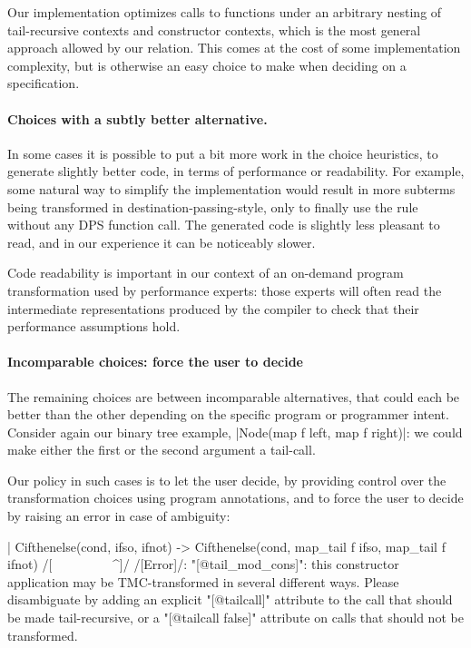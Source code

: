 Our implementation optimizes calls to functions under an arbitrary
nesting of tail-recursive contexts and constructor contexts, which is
the most general approach allowed by our relation. This comes at the
cost of some implementation complexity, but is otherwise an easy
choice to make when deciding on a specification.

\paragraph{Choices with a subtly better alternative.} In some cases it
is possible to put a bit more work in the choice heuristics, to
generate slightly better code, in terms of performance or
readability. For example, some natural way to simplify the
implementation would result in more subterms being transformed in
destination-passing-style, only to finally use the
 rule without any DPS function call. The generated
code is slightly less pleasant to read, and in our experience it can
be noticeably slower.

Code readability is important in our context of an on-demand program
transformation used by performance experts: those experts will often
read the intermediate representations produced by the compiler to
check that their performance assumptions hold.

\paragraph{Incomparable choices: force the user to decide} The
remaining choices are between incomparable alternatives, that could
each be better than the other depending on the specific program or
programmer intent. Consider again our binary tree example,
\ocaml|Node(map f left, map f right)|: we could make either the first
or the second argument a tail-call.

Our policy in such cases is to let the user decide, by providing
control over the transformation choices using \ocaml{[@tailcall]}
program annotations, and to force the user to decide by raising an
error in case of ambiguity:
\begin{Ocaml}
  | Cifthenelse(cond, ifso, ifnot) ->
      Cifthenelse(cond, map_tail f ifso, map_tail f ifnot)
      /[^^^^^^^^^^^^^^^^^^^^^^^^^^^^^^^^^^^^^^^^^^^^^^^^^^^^]/
/[Error]/: "[@tail_mod_cons]": this constructor application may be TMC-transformed
       in several different ways. Please disambiguate by adding an explicit
       "[@tailcall]" attribute to the call that should be made tail-recursive,
       or a "[@tailcall false]" attribute on calls that should not be
       transformed.
\end{Ocaml}

